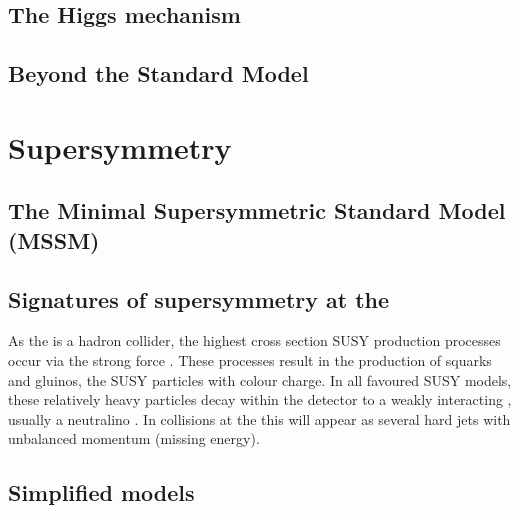 \subsection{The Higgs mechanism}

\subsection{Beyond the Standard Model}





\section{Supersymmetry}
\label{sec:susy}




\subsection{The Minimal Supersymmetric Standard Model (MSSM)}

\subsection{Signatures of supersymmetry at the \LHC}

As the \LHC is a hadron collider, the highest cross section SUSY
production processes occur via the strong force
\cite{Martin:1997ns}
\cite{SUSYxsections_NewAspectsof_pp_collisions}. These processes
result in the production of squarks and gluinos, the SUSY particles
with colour charge. In all favoured SUSY models, these relatively
heavy particles decay within the detector to a weakly interacting \LSP,
usually a neutralino \cite{Farrar:1978xj}. In
collisions at the \LHC this will appear as several hard jets with
unbalanced momentum (missing energy). 

\subsection{Simplified models}


